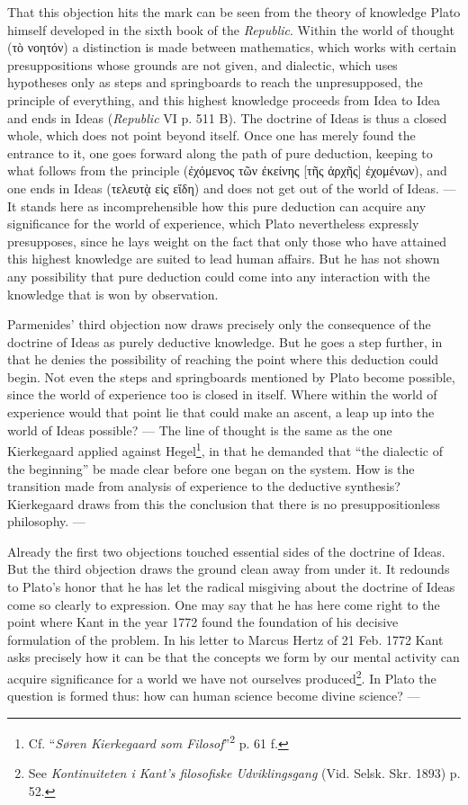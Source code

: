 \documentclass[12pt,a4paper,openany]{book}
\newcommand{\opage}[1]{\marginnote{\footnotesize\textit{[#1]}}}
\begin{document}
That this objection hits the mark can be seen from the theory of knowledge
Plato himself developed in the sixth book of the \textit{Republic}.
Within the world of thought (τὸ νοητόν) a distinction is made between
mathematics, which works with certain presuppositions whose
grounds are not given, and dialectic, which uses
hypotheses only as steps and springboards to reach the unpresupposed,
the principle of everything, and this highest knowledge proceeds
from Idea to Idea and ends in Ideas (\textit{Republic} VI p. 511 B).
The doctrine of Ideas is thus a closed whole, which does not point beyond
itself. Once one has merely found the entrance to it, one goes
forward along the path of pure deduction, keeping to what
follows from the principle (ἐχόμενος τῶν ἐκείνης [τῆς ἀρχῆς]
ἐχομένων), and one ends in Ideas (τελευτᾲ εἰς εἴδη) and
does not get out of the world of Ideas. --- It stands here as
incomprehensible how this pure deduction can acquire any
significance for the world of experience, which Plato nevertheless expressly
presupposes, since he lays weight on the fact that only those
who have attained this highest knowledge are suited to
lead human affairs. But he has not shown
any possibility that pure deduction could come
into any interaction with the knowledge that is won by
observation.

Parmenides’ third objection now draws precisely only the
consequence of the doctrine of Ideas as purely deductive knowledge.
But he goes a step further, in that he denies the possibility
of reaching the point where this deduction could begin.
Not even the steps and springboards mentioned by Plato become possible,
since the world of experience too is closed in itself.
Where within the world of experience would that point lie
that could make an ascent, a leap up into the world of Ideas
\setcounter{footnote}{0}%
\opage{25}possible? --- The line of thought is the same as the one Kierkegaard
applied against Hegel\footnote[1]{Cf. ``\textit{Søren Kierkegaard som Filosof}''\textsuperscript{2} p. 61 f.}, in that he demanded that ``the
dialectic of the beginning'' be made clear before one began
on the system. How is the transition made from analysis of
experience to the deductive synthesis? Kierkegaard draws from this
the conclusion that there is no presuppositionless philosophy. ---

Already the first two objections touched essential
sides of the doctrine of Ideas. But the third objection draws
the ground clean away from under it. It redounds to Plato’s honor
that he has let the radical misgiving about the doctrine of Ideas
come so clearly to expression. One may say that he has here
come right to the point where Kant in the year 1772 found
the foundation of his decisive formulation of the problem. In his letter to
Marcus Hertz of 21 Feb. 1772 Kant asks precisely how
it can be that the concepts we form by our mental
activity can acquire significance for a world we have not
ourselves produced\footnote[2]{See \textit{Kontinuiteten i Kant’s filosofiske Udviklingsgang} (Vid. Selsk. Skr. 1893) p. 52.}. In Plato the question is formed thus:
how can human science become divine
science? ---
\end{document}
